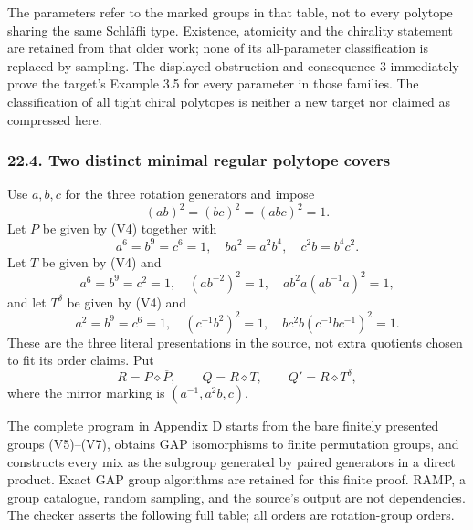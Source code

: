 \documentclass[
  10pt,
  letterpaper,
]{article}
\newcounter{none} %
\begin{document}
The parameters refer to the marked groups in that table, not to every
polytope sharing the same Schläfli type. Existence, atomicity and the
chirality statement are retained from that older work; none of its
all-parameter classification is replaced by sampling. The displayed
obstruction and consequence 3 immediately prove the target's Example 3.5
for every parameter in those families. The classification of all tight
chiral polytopes is neither a new target nor claimed as compressed here.

\subsubsection{22.4. Two distinct minimal regular polytope
covers}\label{two-distinct-minimal-regular-polytope-covers}

Use \(a,b,c\) for the three rotation generators and impose \[
 (ab)^2=(bc)^2=(abc)^2=1.                         \tag{V4}
\] Let \(P\) be given by (V4) together with \[
 a^6=b^9=c^6=1,\quad ba^2=a^2b^4,\quad c^2b=b^4c^2. \tag{V5}
\] Let \(T\) be given by (V4) and \[
 a^6=b^9=c^2=1,\quad (ab^{-2})^2=1,
 \quad ab^2a(ab^{-1}a)^2=1,                         \tag{V6}
\] and let \(T^\delta\) be given by (V4) and \[
 a^2=b^9=c^6=1,\quad(c^{-1}b^2)^2=1,
 \quad bc^2b(c^{-1}bc^{-1})^2=1.                    \tag{V7}
\] These are the three literal presentations in the source, not extra
quotients chosen to fit its order claims. Put \[
 R=P\diamond\overline P,\qquad Q=R\diamond T,
 \qquad Q'=R\diamond T^\delta,
\] where the mirror marking is \((a^{-1},a^2b,c)\).

The complete program in Appendix D starts from the bare finitely
presented groups (V5)--(V7), obtains GAP isomorphisms to finite
permutation groups, and constructs every mix as the subgroup generated
by paired generators in a direct product. Exact GAP group algorithms are
retained for this finite proof. RAMP, a group catalogue, random
sampling, and the source's output are not dependencies. The checker
asserts the following full table; all orders are rotation-group orders.
\end{document}
